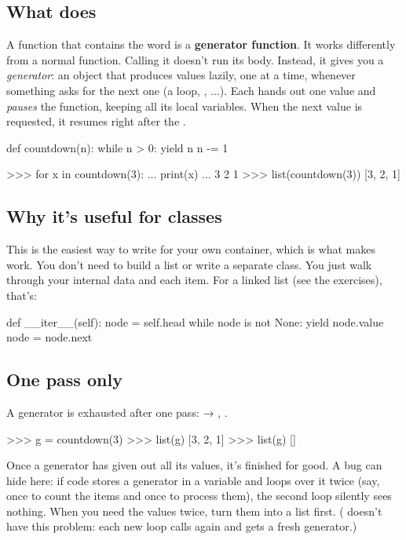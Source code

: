 \documentclass[10pt,a4paper]{article}
\begin{document}
\subsection{What  does}
A function that contains the word  is a \textbf{generator function}. It works differently from a normal function. Calling it doesn’t run its body. Instead, it gives you a \emph{generator}: an object that produces values lazily, one at a time, whenever something asks for the next one (a  loop, , ...). Each  hands out one value and \emph{pauses} the function, keeping all its local variables. When the next value is requested, it resumes right after the .
\begin{pycode}
def countdown(n):
    while n > 0:
        yield n
        n -= 1
\end{pycode}
\begin{txtcode}
>>> for x in countdown(3):
...     print(x)
...
3
2
1
>>> list(countdown(3))
[3, 2, 1]
\end{txtcode}
\subsection{Why it’s useful for classes}
This is the easiest way to write  for your own container, which is what makes  work. You don’t need to build a list or write a separate class. You just walk through your internal data and  each item. For a linked list (see the exercises), that’s:
\begin{pycode}
def __iter__(self):
    node = self.head
    while node is not None:
        yield node.value
        node = node.next
\end{pycode}
\subsection{One pass only}
\begin{trapbox}
A generator is exhausted after one pass:  → , \code{[]}.
\end{trapbox}
\begin{txtcode}
>>> g = countdown(3)
>>> list(g)
[3, 2, 1]
>>> list(g)
[]
\end{txtcode}
Once a generator has given out all its values, it’s finished for good. A bug can hide here: if code stores a generator in a variable and loops over it twice (say, once to count the items and once to process them), the second loop silently sees nothing. When you need the values twice, turn them into a list first. ( doesn’t have this problem: each new  loop calls  again and gets a fresh generator.)
\setcounter{section}{8}
\end{document}
